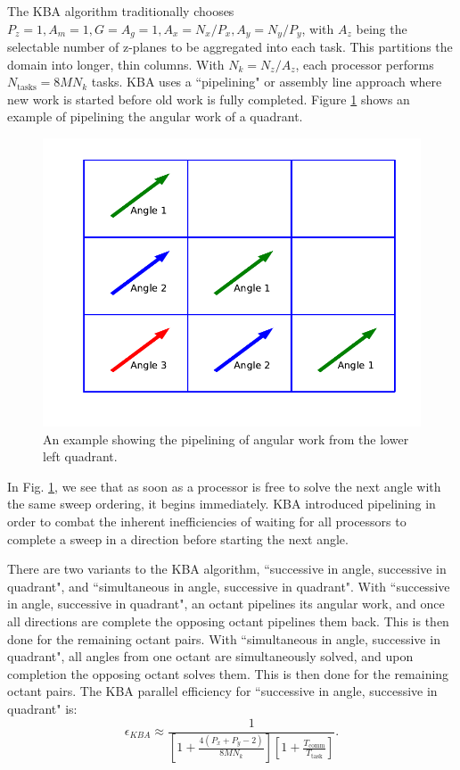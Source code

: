 \documentclass[11pt, letterpaper,titlepage,oneside]{article}
\begin{document}
The KBA algorithm traditionally chooses $P_z = 1, A_m = 1, G = A_g = 1, A_x = N_x/P_x, A_y = N_y/P_y$, with $A_z$ being the selectable number of z-planes to be aggregated into each task. This partitions the domain into longer, thin columns. With $N_k = N_z/A_z$, each processor performs $N_{\text{tasks}} = 8MN_k$ tasks. KBA uses a ``pipelining" or assembly line approach where new work is started before old work is fully completed. Figure \ref{pipeline_example} shows an example of pipelining the angular work of a quadrant.

\begin{figure}[H]
\centering
\includegraphics[scale=0.75,trim={0cm 1cm 0cm 0cm},clip]{../figures/pipeline_example.pdf}
\caption{An example showing the pipelining of angular work from the lower left quadrant.}
\label{pipeline_example}
\end{figure}

In Fig. \ref{pipeline_example}, we see that as soon as a processor is free to solve the next angle with the same sweep ordering, it begins immediately. KBA introduced pipelining in order to combat the inherent inefficiencies of waiting for all processors to complete a sweep in a direction before starting the next angle. 

There are two variants to the KBA algorithm, ``successive in angle, successive in quadrant", and ``simultaneous in angle, successive in quadrant".  With ``successive in angle, successive in quadrant", an octant pipelines its angular work, and once all directions are complete the opposing octant pipelines them back. This is then done for the remaining octant pairs. With ``simultaneous in angle, successive in quadrant", all angles from one octant are simultaneously solved, and upon completion the opposing octant solves them. This is then done for the remaining octant pairs. The KBA parallel efficiency\cite{mpadams2013} for ``successive in angle, successive in quadrant" is:
\begin{equation}
  \epsilon_{KBA} \approx \frac{1}{[1 + \frac{4(P_x+P_y-2)}{8MN_k}][1 + \frac{T_{\text{comm}}}{T_{\text{{task}}}}]}.
\end{equation}
\end{document}
